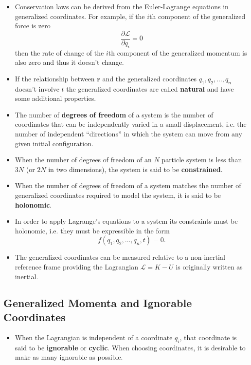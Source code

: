 \documentclass{article}
\renewcommand{\vec}[1]{\boldsymbol{\mathbf{#1}}}
\begin{document}
\begin{itemize}
  \item Conservation laws can be derived from the Euler-Lagrange equations in generalized coordinates. For example, if the $i$th component of the generalized force is zero \[\frac{\partial \mathcal{L}}{\partial q_i} = 0\] then the rate of change of the $i$th component of the generalized momentum is also zero and thus it doesn't change.

  \item If the relationship between $\vec{r}$ and the generalized coordinates $q_1, q_2, \ldots, q_n$ doesn't involve $t$ the generalized coordinates are called \textbf{natural} and have some additional properties.

  \item The number of \textbf{degrees of freedom} of a system is the number of coordinates that can be independently varied in a small displacement, i.e. the number of independent ``directions'' in which the system can move from any given initial configuration.

  \item When the number of degrees of freedom of an $N$ particle system is less than $3 N$ (or $2 N$ in two dimensions), the system is said to be \textbf{constrained}.

  \item When the number of degrees of freedom of a system matches the number of generalized coordinates required to model the system, it is said to be \textbf{holonomic}.

  \item In order to apply Lagrange's equations to a system its constraints must be holonomic, i.e. they must be expressible in the form \[f(q_1, q_2, \ldots, q_n, t) = 0.\]

  \item The generalized coordinates can be measured relative to a non-inertial reference frame providing the Lagrangian $\mathcal{L} = K - U$ is originally written as inertial.
\end{itemize}

\setcounter{subsection}{5}
\subsection{Generalized Momenta and Ignorable Coordinates}

\begin{itemize}
  \item When the Lagrangian is independent of a coordinate $q_i$, that coordinate is said to be \textbf{ignorable} or \textbf{cyclic}. When choosing coordinates, it is desirable to make as many ignorable as possible.
\end{itemize}
\end{document}
